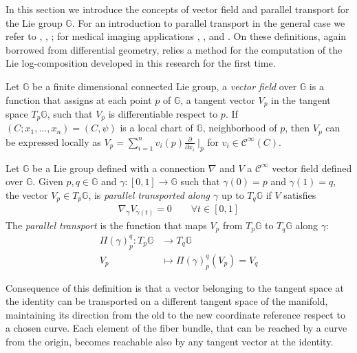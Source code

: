 In this section we introduce the concepts of vector field and parallel transport for the Lie group $\mathbb{G}$. 
For an introduction to parallel transport in the general case we refer to \cite{misner1973gravitation}, \cite{knebelman1951spaces}, \cite{kheyfets2000schild}; for medical imaging applications \cite{lorenzi2011schild}, \cite{pennec2011parallel}, \cite{lorenzi2013geodesics} and \cite{lorenzi2014efficient}.
On these definitions, again borrowed from differential geometry, relies a method for the computation of the Lie log-composition developed in this research for the first time.
\begin{definition}
	Let $\mathbb{G}$ be a finite dimensional connected Lie group, a \emph{vector field} over $\mathbb{G}$ is a function that assigns at each point $p$ of $\mathbb{G}$, a tangent vector $V_{p}$ in the tangent space $T_{p}\mathbb{G}$, such that $V_{p}$ is differentiable respect to $p$.
	If $(C; x_{1}, \dots , x_{n}) = (C,\psi)$ is a local chart of $\mathbb{G}$, neighborhood of $p$, then $V_{p}$ can be expressed locally as $V_{p} = \sum_{i=1}^{n}v_{i}(p) \frac{\partial}{\partial x_{i}}~\Bigr|_{p}$ for $v_{i} \in \mathcal{C}^{\infty}(C)$.\\
\end{definition}
\begin{definition}
	Let $\mathbb{G}$ be a Lie group defined with a connection $\nabla$ and $V$ a $\mathcal{C}^{\infty}$ vector field defined over $\mathbb{G}$. Given $p,q \in \mathbb{G}$ and $\gamma : [0,1] \rightarrow \mathbb{G}$ such that $\gamma(0) = p$ and $\gamma(1) = q$, the vector $V_{p} \in T_{p}\mathbb{G}$, is \emph{parallel transported along $\gamma$} up to $T_{q}\mathbb{G}$ if $V$ satisfies
	\begin{align*}
	\nabla_{\dot{\gamma}}V_{\gamma(t)} = 0
	\qquad
	\forall t \in  [0,1]
	\end{align*}
	The \emph{parallel transport} is the function that maps $V_{p}$ from $T_{p}\mathbb{G}$ to $T_{q}\mathbb{G}$ along $\gamma$:
	\begin{align*}
	\Pi(\gamma)_{p}^{q} :  T_{p}\mathbb{G} & \longrightarrow T_{q}\mathbb{G}  \\
	V_{p}&\longmapsto \Pi(\gamma)_{p}^{q}(V_{p}) = V_{q}
	\end{align*}
\end{definition}

Consequence of this definition is that a vector belonging to the tangent space at the identity can be transported on a different tangent space of the manifold, maintaining its direction from the old to the new coordinate reference respect to a chosen curve. Each element of the fiber bundle, that can be reached by a curve from the origin, becomes reachable also by any tangent vector at the identity.

